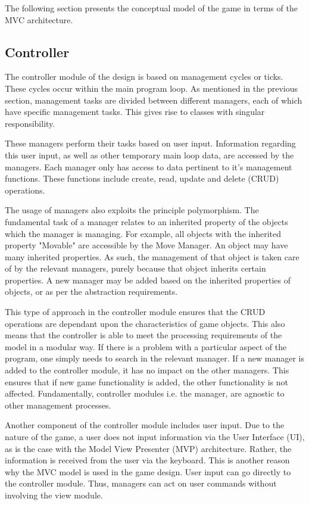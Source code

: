 \documentclass[10pt,twocolumn]{witseiepaper}
\begin{document}
The following section presents the conceptual model of the game in terms of the MVC architecture.

\subsection{Controller}
\label{sub:controller}
The controller module of the design is based on management cycles or ticks. These cycles occur within the main program loop. As mentioned in the previous section, management tasks are divided between different managers, each of which have specific management tasks. This gives rise to classes with singular responsibility. 

These managers perform their tasks based on user input. Information regarding this user input, as well as other temporary main loop data, are accessed by the managers. Each manager only has access to data pertinent to it's management functions. These functions include create, read, update and delete (CRUD) operations.

The usage of managers also exploits the principle polymorphism. The fundamental task of a manager relates to an inherited property of the objects which the manager is managing. For example, all objects with the inherited property "Movable" are accessible by the Move Manager. An object may have many inherited properties. As such, the management of that object is taken care of by the relevant managers, purely because that object inherits certain properties. A new manager may be added based on the inherited properties of objects, or as per the abstraction requirements.

This type of approach in the controller module ensures that the CRUD operations are dependant upon the characteristics of game objects. This also means that the controller is able to meet the processing requirements of the model in a modular way. If there is a problem with a particular aspect of the program, one simply needs to search in the relevant manager. If a new manager is added to the controller module, it has no impact on the other managers. This ensures that if new game functionality is added, the other functionality is not affected. Fundamentally, controller modules i.e. the manager, are agnostic to other management processes.

Another component of the controller module includes user input. Due to the nature of the game, a user does not input information via the User Interface (UI), as is the case with the Model View Presenter (MVP) architecture. Rather, the information is received from the user via the keyboard. This is another reason why the MVC model is used in the game design. User input can go directly to the controller module. Thus, managers can act on user commands without involving the view module.
\end{document}
